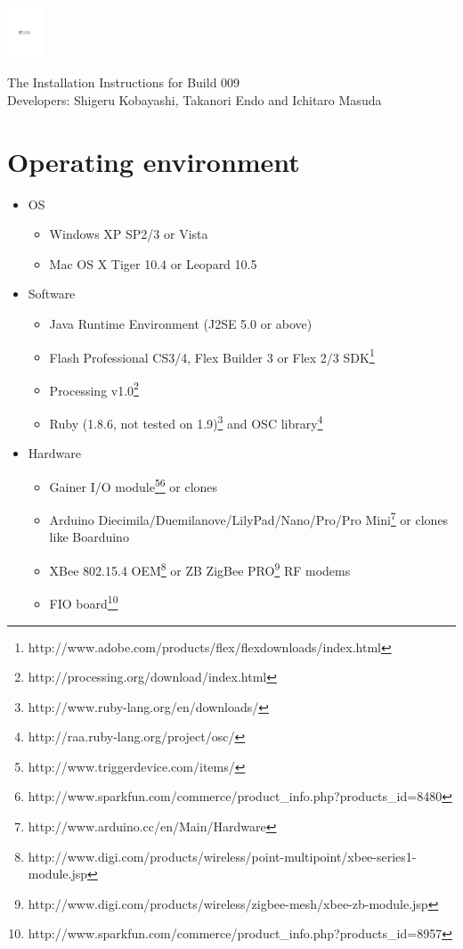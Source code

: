 \documentclass[9pt]{jsarticle}
\begin{document}
\hspace{-8.5pt}\includegraphics[cropboxonly, height=1.5cm, clip]{funnel_logo.pdf}

\vspace{8pt}

\hspace{-8.5pt}\textsf{{\large The Installation Instructions for Build 009}\\Developers: Shigeru Kobayashi, Takanori Endo and Ichitaro Masuda}

\vspace{8pt}

\section{Operating environment}
\begin{itemize}
\item OS
	\begin{itemize}
	\item Windows XP SP2/3 or Vista
	\item Mac OS X Tiger 10.4 or Leopard 10.5
	\end{itemize}
\item Software
	\begin{itemize}
	\item Java Runtime Environment (J2SE 5.0 or above)
	\item Flash Professional CS3/4, Flex Builder 3 or Flex 2/3 SDK\footnote{http://www.adobe.com/products/flex/flexdownloads/index.html}
	\item Processing v1.0\footnote{http://processing.org/download/index.html}
	\item Ruby (1.8.6, not tested on 1.9)\footnote{http://www.ruby-lang.org/en/downloads/} and OSC library\footnote{http://raa.ruby-lang.org/project/osc/}
	\end{itemize}
\item Hardware
	\begin{itemize}
	\item Gainer I/O module\footnote{http://www.triggerdevice.com/items/}\footnote{http://www.sparkfun.com/commerce/product\_info.php?products\_id=8480} or clones
	\item Arduino Diecimila/Duemilanove/LilyPad/Nano/Pro/Pro Mini\footnote{http://www.arduino.cc/en/Main/Hardware} or clones like Boarduino
	\item XBee 802.15.4 OEM\footnote{http://www.digi.com/products/wireless/point-multipoint/xbee-series1-module.jsp} or ZB ZigBee PRO\footnote{http://www.digi.com/products/wireless/zigbee-mesh/xbee-zb-module.jsp} RF modems
	\item FIO board\footnote{http://www.sparkfun.com/commerce/product\_info.php?products\_id=8957}
	\end{itemize}
\end{itemize}
\end{document}
